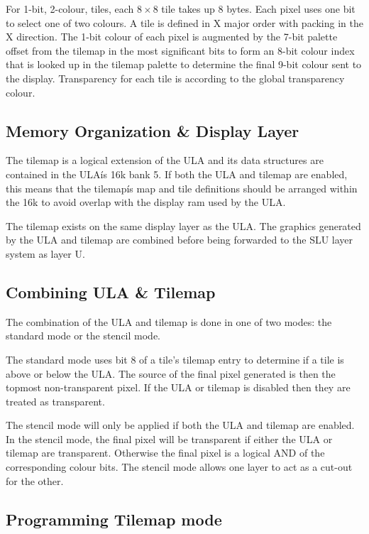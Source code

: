 For 1-bit, 2-colour, tiles, each $8\times8$ tile takes up 8
bytes. Each pixel uses one bit to select one of two colours. A tile is
defined in X major order with packing in the X direction. The 1-bit
colour of each pixel is augmented by the 7-bit palette offset from the
tilemap in the most significant bits to form an 8-bit colour index
that is looked up in the tilemap palette to determine the final 9-bit
colour sent to the display. Transparency for each tile is according to
the global transparency colour.

\subsection{Memory Organization \& Display Layer}
The tilemap is a logical extension of the ULA and its data structures
are contained in the ULAís 16k bank 5. If both the ULA and tilemap are
enabled, this means that the tilemapís map and tile definitions should
be arranged within the 16k to avoid overlap with the display ram used
by the ULA.

The tilemap exists on the same display layer as the ULA. The graphics
generated by the ULA and tilemap are combined before being forwarded
to the SLU layer system as layer U.

\subsection{Combining ULA \& Tilemap}
The combination of the ULA and tilemap is done in one of two modes:
the standard mode or the stencil mode.

The standard mode uses bit 8 of a tile's tilemap entry to determine if
a tile is above or below the ULA. The source of the final pixel
generated is then the topmost non-transparent pixel. If the ULA or
tilemap is disabled then they are treated as transparent.

The stencil mode will only be applied if both the ULA and tilemap are
enabled. In the stencil mode, the final pixel will be transparent if
either the ULA or tilemap are transparent. Otherwise the final pixel
is a logical AND of the corresponding colour bits. The stencil mode
allows one layer to act as a cut-out for the other.

\subsection{Programming Tilemap mode}

